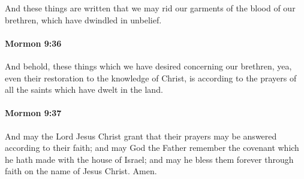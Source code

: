 			And these things are written
			that we may rid our garments of the blood of our brethren,
			which have dwindled in unbelief.

		\paragraph{Mormon 9:36} %
			\label{MORMON-9-36}

			And behold, these things which we have desired concerning our brethren,
			yea, even their restoration to the knowledge of Christ,
			is according to the prayers of all the saints which have dwelt in the land.

		\paragraph{Mormon 9:37} %
			\label{MORMON-9-37}

			And may the Lord Jesus Christ grant
			that their prayers may be answered according to their faith;
			and may God the Father remember the covenant
			which he hath made with the house of Israel;
			and may he bless them forever
			through faith on the name of Jesus Christ.
			Amen.